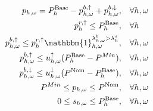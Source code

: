 \begin{subequations}\label{eq:power_constraints}
    \begin{align}
        p_{h,\omega} = P^{\text{Base}}_{h} - p^{b, \uparrow}_{h,\omega} + p^{b, \downarrow}_{h,\omega}, \quad                                                                                          & \forall{h,\omega}                                                                             \label{con_power:subeq1}  \\
        p^{r, \uparrow}_h \leq P^{\text{Base}}_h, \quad                                                                                                                                                & \forall{h}                                                                                     \label{con_power:subeq2} \\
        p^{b, \uparrow}_{h,\omega} \leq p^{r, \uparrow}_h \mathbbm{1}_{h,\omega}^{\lambda^{b}_{h,\omega} > \lambda^{s}_{h}} , \quad                                                                    & \forall{h,\omega}                                                                             \label{con_power:subeq3}  \\
        p^{b, \uparrow}_{h,\omega} \leq u_{h,\omega}^{\uparrow} (P^{\text{Base}}_{h} - P^{Min}) , \quad                                                                                                & \forall{h,\omega}                                                                             \label{con_power:subeq4}  \\
        p^{b, \downarrow}_{h,\omega} \leq u^{\downarrow}_{h,\omega} (P^{\text{Nom}} -P^{\text{Base}}_{h}), \quad                                                                                       & \forall{h,\omega}                                                                             \label{con_power:subeq5}  \\
        P^{Min} \leq p_{h,\omega} \leq P^{\text{Nom}}, \quad                                                                                                                                           & \forall{h,\omega}                                                                             \label{con_power:subeq6}  \\
        0 \leq s_{h,\omega} \leq P^{\text{Base}}_{h}, \quad                                                                                                                                            & \forall{h,\omega}                                                                             \label{con_power:subeq7}  \\

\end{align}
\end{subequations}
